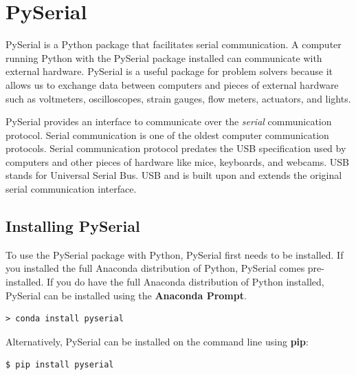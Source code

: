 \documentclass{book}
\begin{document}
    




    
        \section{PySerial}\label{pyserial}
    




    
        PySerial is a Python package that facilitates serial communication. A
computer running Python with the PySerial package installed can
communicate with external hardware. PySerial is a useful package for
problem solvers because it allows us to exchange data between computers
and pieces of external hardware such as voltmeters, oscilloscopes,
strain gauges, flow meters, actuators, and lights.

PySerial provides an interface to communicate over the \emph{serial}
communication protocol. Serial communication is one of the oldest
computer communication protocols. Serial communication protocol predates
the USB specification used by computers and other pieces of hardware
like mice, keyboards, and webcams. USB stands for Universal Serial Bus.
USB and is built upon and extends the original serial communication
interface.
    




    
        \subsection{Installing PySerial}\label{installing-pyserial}
    




    
        To use the PySerial package with Python, PySerial first needs to be
installed. If you installed the full Anaconda distribution of Python,
PySerial comes pre-installed. If you do have the full Anaconda
distribution of Python installed, PySerial can be installed using the
\textbf{Anaconda Prompt}.

\begin{lstlisting}
> conda install pyserial
\end{lstlisting}

Alternatively, PySerial can be installed on the command line using
\textbf{pip}:

\begin{lstlisting}
$ pip install pyserial
\end{lstlisting}
\end{document}
